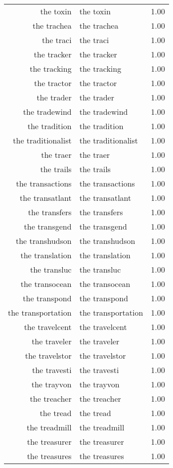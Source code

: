 \begin{table}[ht]
\begin{tabular}{rlr}
  the toxin & the toxin & 1.00 \\ 
  the trachea & the trachea & 1.00 \\ 
  the traci & the traci & 1.00 \\ 
  the tracker & the tracker & 1.00 \\ 
  the tracking & the tracking & 1.00 \\ 
  the tractor & the tractor & 1.00 \\ 
  the trader & the trader & 1.00 \\ 
  the tradewind & the tradewind & 1.00 \\ 
  the tradition & the tradition & 1.00 \\ 
  the traditionalist & the traditionalist & 1.00 \\ 
  the traer & the traer & 1.00 \\ 
  the trails & the trails & 1.00 \\ 
  the transactions & the transactions & 1.00 \\ 
  the transatlant & the transatlant & 1.00 \\ 
  the transfers & the transfers & 1.00 \\ 
  the transgend & the transgend & 1.00 \\ 
  the transhudson & the transhudson & 1.00 \\ 
  the translation & the translation & 1.00 \\ 
  the transluc & the transluc & 1.00 \\ 
  the transocean & the transocean & 1.00 \\ 
  the transpond & the transpond & 1.00 \\ 
  the transportation & the transportation & 1.00 \\ 
  the travelcent & the travelcent & 1.00 \\ 
  the traveler & the traveler & 1.00 \\ 
  the travelstor & the travelstor & 1.00 \\ 
  the travesti & the travesti & 1.00 \\ 
  the trayvon & the trayvon & 1.00 \\ 
  the treacher & the treacher & 1.00 \\ 
  the tread & the tread & 1.00 \\ 
  the treadmill & the treadmill & 1.00 \\ 
  the treasurer & the treasurer & 1.00 \\ 
  the treasures & the treasures & 1.00 \\ 

\end{tabular}
\end{table}
